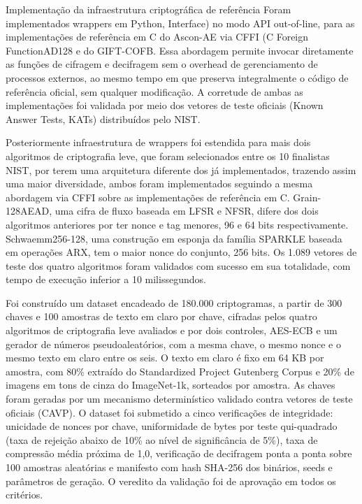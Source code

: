 \begin{tarefac}Implementação da infraestrutura criptográfica de referência
Foram implementados wrappers em Python, Interface) no modo API out-of-line, para as implementações de referência em C do Ascon-AE via CFFI (C Foreign FunctionAD128 e do GIFT-COFB. Essa abordagem permite invocar diretamente as funções de cifragem e decifragem sem o overhead de gerenciamento de processos externos, ao mesmo tempo em que preserva integralmente o código de referência oficial, sem qualquer modificação. A corretude de ambas as implementações foi validada por meio dos vetores de teste oficiais (Known Answer Tests, KATs) distribuídos pelo NIST. 

Posteriormente infraestrutura de wrappers foi estendida para mais dois algoritmos de criptografia leve, que foram selecionados entre os 10 finalistas NIST, por terem uma arquitetura diferente dos já implementados, trazendo assim uma maior diversidade, ambos foram implementados seguindo a mesma abordagem via CFFI sobre as implementações de referência em C. Grain-128AEAD, uma cifra de fluxo baseada em LFSR e NFSR, difere dos dois algoritmos anteriores por ter nonce e tag menores, 96 e 64 bits respectivamente. Schwaemm256-128, uma construção em esponja da família SPARKLE baseada em operações ARX, tem o maior nonce do conjunto, 256 bits. Os 1.089 vetores de teste dos quatro algoritmos foram validados com sucesso em sua totalidade, com tempo de execução inferior a 10 milissegundos.  
\end{tarefac}
 
\begin{tarefac}
 Foi construído um dataset encadeado de 180.000 criptogramas, a partir de 300 chaves e 100 amostras de texto em claro por chave, cifradas pelos quatro algoritmos de criptografia leve avaliados e por dois controles, AES-ECB e um gerador de números pseudoaleatórios, com a mesma chave, o mesmo nonce e o mesmo texto em claro entre os seis. O texto em claro é fixo em 64 KB por amostra, com 80\% extraído do Standardized Project Gutenberg Corpus e 20\% de imagens em tons de cinza do ImageNet-1k, sorteados por amostra. As chaves foram geradas por um mecanismo determinístico validado contra vetores de teste oficiais (CAVP). O dataset foi submetido a cinco verificações de integridade: unicidade de nonces por chave, uniformidade de bytes por teste qui-quadrado (taxa de rejeição abaixo de 10\% ao nível de significância de 5\%), taxa de compressão média próxima de 1,0, verificação de decifragem ponta a ponta sobre 100 amostras aleatórias e manifesto com hash SHA-256 dos binários, seeds e parâmetros de geração. O veredito da validação foi de aprovação em todos os critérios.


\end{tarefac}
 
